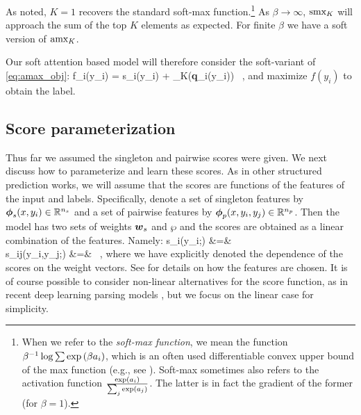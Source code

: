 As noted, $K=1$ recovers the standard soft-max function.\footnote{When we refer to the {\em soft-max function}, we mean the function $\beta^{-1}\log\sum \exp\left({\beta a_i}\right)$, which is an often used differentiable convex upper bound of the max function (e.g., see \cite{gimpel2010softmax}). Soft-max sometimes
also refers to the activation function $\frac{\exp\left({a_i}\right)}{\sum_{j} \exp\left({a_j}\right)}$. The latter is in fact the gradient of the former (for $\beta=1$). }
As $\beta \to \infty$, $\text{smx}_K$ will approach the sum of the top $K$ elements as expected. For  finite $\beta$ we have a soft version of $\text{amx}_K$.

Our soft attention based model will therefore consider the soft-variant of \eqref{eq:amax_obj}:
\be
f_i(y_i) = s_i(y_i) + \samax_K({\bf q}_{i}(y_i)) ~,
\label{eq:samax_obj}
\ee
and maximize $f(y_i)$ to obtain the label.
 
\subsection{Score parameterization \label{sec:score_param}}
Thus far we assumed the singleton and pairwise scores were given. We next discuss how to parameterize and learn these scores. As in other structured prediction works, we will assume that the scores are functions of the features of the input and labels. Specifically, denote a set of singleton features by $\boldsymbol{\phi}_s(x,y_i)\in\mathbb{R}^{n_s}$ and a set of pairwise features by $\boldsymbol{\phi}_p(x,y_i,y_j)\in\mathbb{R}^{n_p}$. Then the model has two sets of weights $\boldsymbol{w}_s$ and $\wp$ and the scores are obtained as a linear combination of the features. Namely:
\bea
s_i(y_i;\ws) &=& \ws\cdot\fs  \\
s_{ij}(y_i,y_j;\wp) &=& \wp\cdot\fp ~,
\eea
where we have explicitly denoted the dependence of the scores on the weight vectors.  See  for details on how the features are chosen. It is of course possible to consider non-linear alternatives for the score function, as in recent deep learning parsing models \cite{chen2014fast,neurosis}, but we focus on the linear case for simplicity.

